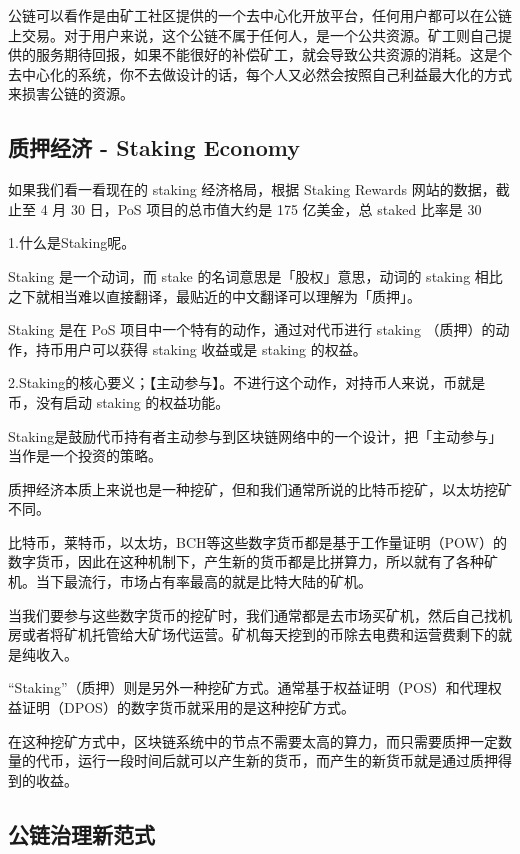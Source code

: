 公链可以看作是由矿工社区提供的一个去中心化开放平台，任何用户都可以在公链上交易。对于用户来说，这个公链不属于任何人，是一个公共资源。矿工则自己提供的服务期待回报，如果不能很好的补偿矿工，就会导致公共资源的消耗。这是个去中心化的系统，你不去做设计的话，每个人又必然会按照自己利益最大化的方式来损害公链的资源。

\subsection{质押经济 - Staking Economy}
如果我们看一看现在的 staking 经济格局，根据 Staking Rewards 网站的数据，截止至 4 月 30 日，PoS 项目的总市值大约是 175 亿美金，总 staked 比率是 30%

1.什么是Staking呢。

Staking 是一个动词，而 stake 的名词意思是「股权」意思，动词的 staking 相比之下就相当难以直接翻译，最贴近的中文翻译可以理解为「质押」。

Staking 是在 PoS 项目中一个特有的动作，通过对代币进行 staking （质押）的动作，持币用户可以获得 staking 收益或是 staking 的权益。

2.Staking的核心要义；【主动参与】。不进行这个动作，对持币人来说，币就是币，没有启动 staking 的权益功能。

Staking是鼓励代币持有者主动参与到区块链网络中的一个设计，把「主动参与」当作是一个投资的策略。

质押经济本质上来说也是一种挖矿，但和我们通常所说的比特币挖矿，以太坊挖矿不同。

比特币，莱特币，以太坊，BCH等这些数字货币都是基于工作量证明（POW）的数字货币，因此在这种机制下，产生新的货币都是比拼算力，所以就有了各种矿机。当下最流行，市场占有率最高的就是比特大陆的矿机。

当我们要参与这些数字货币的挖矿时，我们通常都是去市场买矿机，然后自己找机房或者将矿机托管给大矿场代运营。矿机每天挖到的币除去电费和运营费剩下的就是纯收入。

“Staking”（质押）则是另外一种挖矿方式。通常基于权益证明（POS）和代理权益证明（DPOS）的数字货币就采用的是这种挖矿方式。

在这种挖矿方式中，区块链系统中的节点不需要太高的算力，而只需要质押一定数量的代币，运行一段时间后就可以产生新的货币，而产生的新货币就是通过质押得到的收益。

\subsection{公链治理新范式}
